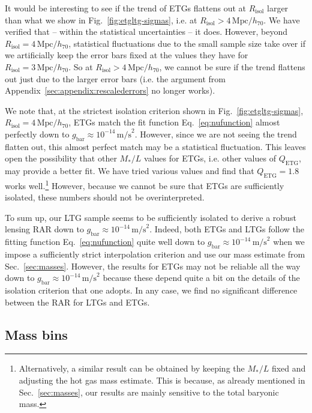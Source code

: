 \documentclass[a4paper,11pt]{article}
\newcommand{\gbar}{\ensuremath{g_{\mathrm{bar}}}}
\begin{document}
It would be interesting to see if the trend of ETGs flattens out at $R_{\mathrm{isol}}$ larger than what we show in Fig.~\ref{fig:etgltg-sigmas}, i.e. at $R_{\mathrm{isol}} > 4\,\mathrm{Mpc}/h_{70}$.
We have verified that -- within the statistical uncertainties -- it does.
However, beyond $R_{\mathrm{isol}} = 4\,\mathrm{Mpc}/h_{70}$, statistical fluctuations due to the small sample size take over if we artificially keep the error bars fixed at the values they have for $R_{\mathrm{isol}} = 3\,\mathrm{Mpc}/h_{70}$.
So at $R_{\mathrm{isol}} > 4\,\mathrm{Mpc}/h_{70}$, we cannot be sure if the trend flattens out just due to the larger error bars (i.e. the argument from Appendix~\ref{sec:appendix:rescalederrors} no longer works).

We note that, at the strictest isolation criterion shown in Fig.~\ref{fig:etgltg-sigmas}, $R_{\mathrm{isol}} = 4\,\mathrm{Mpc}/h_{70}$, ETGs match the fit function Eq.~\eqref{eq:nufunction} almost perfectly down to $\gbar \approx 10^{-14}\,\mathrm{m/s}^2$.
However, since we are not seeing the trend flatten out, this almost perfect match may be a statistical fluctuation.
This leaves open the possibility that other $M_\ast/L$ values for ETGs, i.e. other values of $Q_{\mathrm{ETG}}$, may provide a better fit.
We have tried various values and find that $Q_{\mathrm{ETG}} = 1.8$ works well.\footnote{
  Alternatively, a similar result can be obtained by keeping the $M_\ast/L$ fixed and adjusting the hot gas mass estimate.
  This is because, as already mentioned in Sec.~\ref{sec:masses}, our results are mainly sensitive to the total baryonic mass.
}
However, because we cannot be sure that ETGs are sufficiently isolated, these numbers should not be overinterpreted.

To sum up, our LTG sample seems to be sufficiently isolated to derive a robust lensing RAR down to $\gbar \approx 10^{-14}\,\mathrm{m/s}^2$.
Indeed, both ETGs and LTGs follow the fitting function Eq.~\eqref{eq:nufunction} quite well down to $\gbar \approx 10^{-14}\,\mathrm{m/s}^2$ when we impose a sufficiently strict interpolation criterion and use our mass estimate from Sec.~\ref{sec:masses}.
However, the results for ETGs may not be reliable all the way down to $\gbar \approx 10^{-14}\,\mathrm{m/s}^2$ because these depend quite a bit on the details of the isolation criterion that one adopts.
In any case, we find no significant difference between the RAR for LTGs and ETGs.

\subsection{Mass bins}
\label{sec:massbins}
\end{document}
